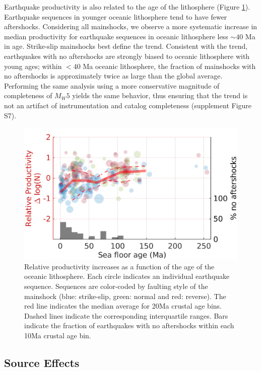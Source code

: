 \documentclass[draft]{agujournal2018}
\begin{document}
    Earthquake productivity is also related to the age of the lithosphere  (Figure \ref{fig:prod_vs_age}). Earthquake sequences in younger oceanic lithosphere tend to have fewer aftershocks. Considering all mainshocks, we observe a more systematic increase in median productivity for earthquake sequences in oceanic lithosphere less $\sim 40$ Ma in age. Strike-slip mainshocks best define the trend. Consistent with the trend, earthquakes with no aftershocks are strongly biased to oceanic lithosphere with young ages; within $<$40 Ma oceanic lithosphere, the fraction of mainshocks with no aftershocks is approximately twice as large than the global average. Performing the same analysis using a more conservative magnitude of completeness of $M_W5$ yields the same behavior, thus ensuring that the trend is not an artifact of instrumentation and catalog completeness (supplement Figure S7).
    
    \begin{figure}
        \centering
        \includegraphics{figures/prod_vs_age.png}
        \caption{Relative productivity increases as a function of the age of the oceanic lithosphere. Each circle indicates an individual earthquake sequence. Sequences are color-coded by faulting style of the mainshock (blue: strike-slip, green: normal and red: reverse). The red line indicates the median average for 20Ma crustal age bins. Dashed lines indicate the corresponding interquartile ranges. Bars indicate the fraction of earthquakes with no aftershocks within each 10Ma crustal age bin.}
        \label{fig:prod_vs_age}
    \end{figure}
    
    \subsection{Source Effects}\label{sec:source_parameters}
\end{document}
